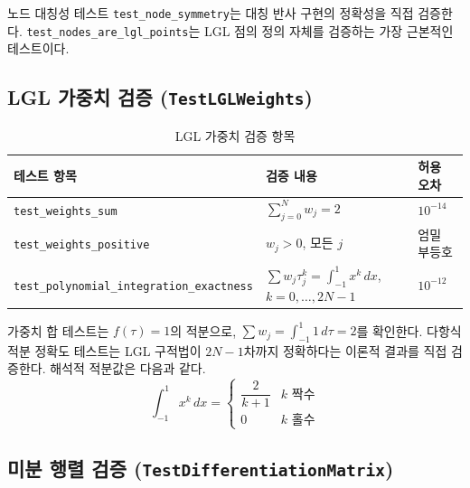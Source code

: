 \documentclass[11pt]{article}
\begin{document}
노드 대칭성 테스트 \texttt{test\_node\_symmetry}는 대칭 반사 구현의 정확성을 직접 검증한다. \texttt{test\_nodes\_are\_lgl\_points}는 LGL 점의 정의 자체를 검증하는 가장 근본적인 테스트이다.

\subsection{LGL 가중치 검증 (\texttt{TestLGLWeights})}
\label{sec:test_weights}

\begin{table}[htbp]
\centering
\caption{LGL 가중치 검증 항목}
\label{tab:test_weights}
\small
\begin{tabular}{@{}lll@{}}
\toprule
테스트 항목 & 검증 내용 & 허용 오차 \\
\midrule
\texttt{test\_weights\_sum} & $\sum_{j=0}^{N} w_j = 2$ & $10^{-14}$ \\
\texttt{test\_weights\_positive} & $w_j > 0$, 모든 $j$ & 엄밀 부등호 \\
\texttt{test\_polynomial\_integration\_exactness} & $\sum w_j \tau_j^k = \int_{-1}^{1} x^k\, dx$, $k = 0, \ldots, 2N-1$ & $10^{-12}$ \\
\bottomrule
\end{tabular}
\end{table}

가중치 합 테스트는 $f(\tau) = 1$의 적분으로, $\sum w_j = \int_{-1}^{1} 1\, d\tau = 2$를 확인한다. 다항식 적분 정확도 테스트는 LGL 구적법이 $2N-1$차까지 정확하다는 이론적 결과를 직접 검증한다. 해석적 적분값은 다음과 같다.
\[
\int_{-1}^{1} x^k\, dx = \begin{cases} \dfrac{2}{k+1} & k \text{ 짝수} \\[6pt] 0 & k \text{ 홀수} \end{cases}
\]

\subsection{미분 행렬 검증 (\texttt{TestDifferentiationMatrix})}
\label{sec:test_diffmat}
\end{document}
